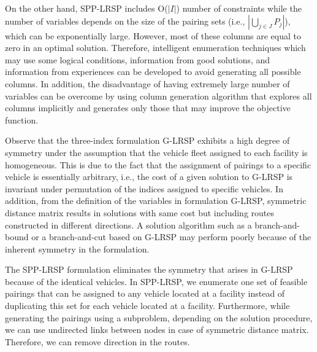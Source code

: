 On the other hand, SPP-LRSP includes O($|I|$) number of constraints
while the number of variables depends on the size of the pairing 
sets (i.e., $|\bigcup_{j \in J}P_j|$), which can be exponentially 
large. However, most of these columns are equal to zero in an 
optimal solution. Therefore, intelligent enumeration techniques 
which may use some logical conditions, information from good 
solutions, and information from experiences can be developed to 
avoid generating all possible columns. In addition, the 
disadvantage of having extremely large number of variables can 
be overcome by using column generation algorithm that explores
all columns implicitly and generates only those that may improve 
the objective function. 
  

Observe that the three-index formulation G-LRSP exhibits a high 
degree of symmetry under the assumption that the vehicle 
fleet assigned to each facility is homogeneous. This is due to the 
fact that the assignment of pairings to a specific vehicle is
essentially arbitrary, i.e., the cost of a given solution to 
G-LRSP is invariant under permutation of the indices assigned to 
specific vehicles. In addition, from the definition of the variables
in formulation G-LRSP, symmetric distance matrix results in solutions
with same cost but including routes constructed in different 
directions. A solution algorithm such as a branch-and-bound
or a branch-and-cut based on G-LRSP may perform poorly
because of the inherent symmetry in the formulation. 

The SPP-LRSP formulation eliminates the symmetry 
that arises in G-LRSP because of the identical vehicles. In SPP-LRSP,
we enumerate one set of feasible pairings that can be assigned to any 
vehicle located at a facility instead of duplicating this set for 
each vehicle located at a facility. Furthermore, while generating
the pairings using a subproblem, depending on the solution procedure, 
we can use undirected links between nodes in case of symmetric distance
matrix. Therefore, we can remove direction in the routes.  

